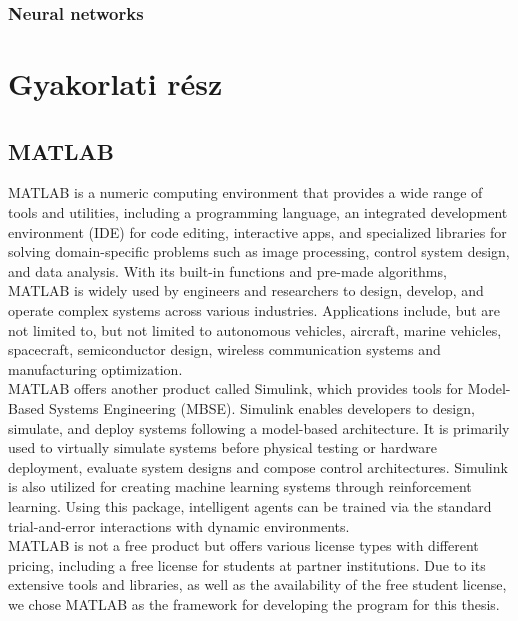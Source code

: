 \documentclass[a4paper,oneside,onecolumn,12pt]{LegrandOrangeBook}
\begin{document}
		\subsection{Neural networks}


\chapter{Gyakorlati rész}
\section{MATLAB\textsuperscript{\textcopyright}}
MATLAB is a numeric computing environment that provides a wide range of tools and utilities, including a programming language, an integrated development environment (IDE) for code editing, interactive apps, and specialized libraries for solving domain-specific problems such as image processing, control system design, and data analysis. With its built-in functions and pre-made algorithms, MATLAB is widely used by engineers and researchers to design, develop, and operate complex systems across various industries. Applications include, but are not limited to, but not limited to autonomous vehicles, aircraft, marine vehicles, spacecraft, semiconductor design, wireless communication systems and manufacturing optimization. \cite{WhatIsMATLAB}\\
MATLAB offers another product called Simulink, which provides tools for Model-Based Systems Engineering (MBSE). Simulink enables developers to design, simulate, and deploy systems following a model-based architecture. It is primarily used to virtually simulate systems before physical testing or hardware deployment, evaluate system designs and compose control architectures. \cite{WhatIsSimulink} Simulink is also utilized for creating machine learning systems through reinforcement learning. Using this package, intelligent agents can be trained via the standard trial-and-error interactions with dynamic environments. \cite{SimulinkAI}\\
MATLAB is not a free product but offers various license types with different pricing, including a free license for students at partner institutions. \cite{MATLABPricing} Due to its extensive tools and libraries, as well as the availability of the free student license, we chose MATLAB as the framework for developing the program for this thesis.\\
\end{document}
